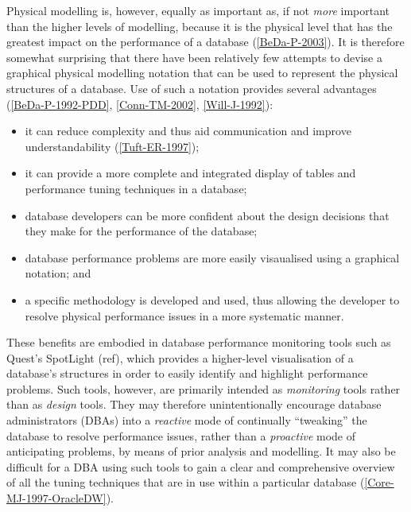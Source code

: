 \documentclass{llncs}
\begin{document}
Physical modelling is, however, equally as important as, if not \emph{more} important than the higher levels of modelling, because it is the physical level that has the greatest impact on the performance of a database (\ref{BeDa-P-2003}). It is therefore somewhat surprising that there have been relatively few attempts to devise a graphical physical modelling notation that can be used to represent the physical structures of a database. Use of such a notation provides several advantages (\ref{BeDa-P-1992-PDD}, \ref{Conn-TM-2002}, \ref{Will-J-1992}):

\begin{itemize}

	\item it can reduce complexity and thus aid communication and improve understandability (\ref{Tuft-ER-1997});

	\item it can provide a more complete and integrated display of tables and performance tuning techniques in a database;
	
	\item database developers can be more confident about the design decisions that they make for the performance of the database;
	
	\item database performance problems are more easily visaualised using a graphical notation; and
	
	\item a specific methodology is developed and used, thus allowing the developer to resolve physical performance issues in a more systematic manner.

\end{itemize}

These benefits are embodied in database performance monitoring tools such as Quest's SpotLight (ref), which provides a higher-level visualisation of a database's structures in order to easily identify and highlight performance problems. Such tools, however, are primarily intended as \emph{monitoring} tools rather than as \emph{design} tools. They may therefore unintentionally encourage database administrators (DBAs) into a \emph{reactive} mode of continually ``tweaking'' the database to resolve performance issues, rather than a \emph{proactive} mode of anticipating problems, by means of prior analysis and modelling. It may also be difficult for a DBA using such tools to gain a clear and comprehensive overview of all the tuning techniques that are in use within a particular database (\ref{Core-MJ-1997-OracleDW}).
\end{document}
